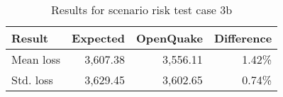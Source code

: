 \begin{table}[htbp]

\centering
\begin{tabular}{ l r r r }

\hline
\rowcolor{anti-flashwhite}
\bf{Result} & \bf{Expected} & \bf{OpenQuake} & \bf{Difference}\\
\hline
Mean loss & 3,607.38 & 3,556.11 & 1.42\% \\
Std. loss & 3,629.45 & 3,602.65 & 0.74\% \\
\hline
\end{tabular}

\caption{Results for scenario risk test case 3b}
\label{tab:result-sr-3b}
\end{table}